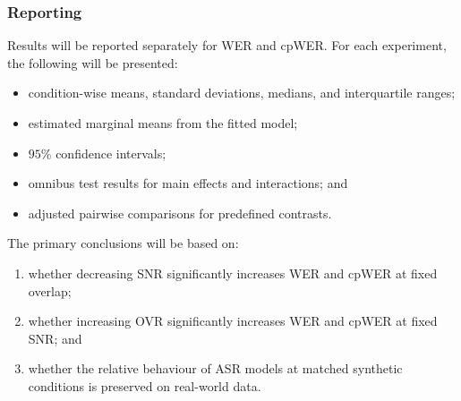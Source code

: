 \subsubsection{Reporting}

Results will be reported separately for WER and cpWER. For each experiment, the following will be presented:
\begin{itemize}
    \item condition-wise means, standard deviations, medians, and interquartile ranges;
    \item estimated marginal means from the fitted model;
    \item \(95\%\) confidence intervals;
    \item omnibus test results for main effects and interactions; and
    \item adjusted pairwise comparisons for predefined contrasts.
\end{itemize}

The primary conclusions will be based on:
\begin{enumerate}
    \item whether decreasing SNR significantly increases WER and cpWER at fixed overlap;
    \item whether increasing OVR significantly increases WER and cpWER at fixed SNR; and
    \item whether the relative behaviour of ASR models at matched synthetic conditions is preserved on real-world data.
\end{enumerate}